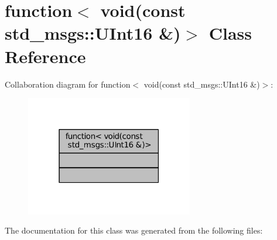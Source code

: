 \hypertarget{classstd_1_1function_3_01void_07const_01std__msgs_1_1UInt16_01_6_08_4}{}\section{function$<$ void(const std\+\_\+msgs\+:\+:U\+Int16 \&)$>$ Class Reference}
\label{classstd_1_1function_3_01void_07const_01std__msgs_1_1UInt16_01_6_08_4}


Collaboration diagram for function$<$ void(const std\+\_\+msgs\+:\+:U\+Int16 \&)$>$\+:
\nopagebreak
\begin{figure}[H]
\begin{center}
\leavevmode
\includegraphics[width=207pt]{classstd_1_1function_3_01void_07const_01std__msgs_1_1UInt16_01_6_08_4__coll__graph}
\end{center}
\end{figure}


The documentation for this class was generated from the following files\+: